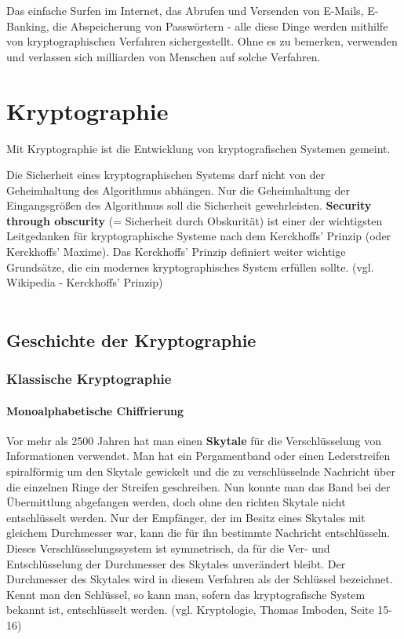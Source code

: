 \documentclass[11pt,a4paper]{report}
\begin{document}
Das einfache Surfen im Internet, das Abrufen und Versenden von E-Mails, E-Banking, die Abspeicherung von Passwörtern - alle diese Dinge werden mithilfe von kryptographischen Verfahren sichergestellt. Ohne es zu bemerken, verwenden und verlassen sich milliarden von Menschen auf solche Verfahren.

\section{Kryptographie}

Mit Kryptographie ist die Entwicklung von kryptografischen Systemen gemeint.

Die Sicherheit eines kryptographischen Systems darf nicht von der Geheimhaltung des Algorithmus abhängen. Nur die Geheimhaltung der Eingangsgrößen des Algorithmus soll die Sicherheit gewehrleisten. \textbf{Security through obscurity} (= Sicherheit durch Obskurität) ist einer der wichtigsten Leitgedanken für kryptographische Systeme nach dem Kerckhoffs' Prinzip (oder Kerckhoffs' Maxime). Das Kerckhoffs' Prinzip definiert weiter wichtige Grundsätze, die ein modernes kryptographisches System erfüllen sollte. (vgl. Wikipedia - Kerckhoffs' Prinzip)\\\\

\subsection{Geschichte der Kryptographie}

\subsubsection{Klassische Kryptographie}

\paragraph{Monoalphabetische Chiffrierung}

Vor mehr als 2500 Jahren hat man einen \textbf{Skytale} für die Verschlüsselung von Informationen verwendet. Man hat ein Pergamentband oder einen Lederstreifen spiralförmig um den Skytale gewickelt und die zu verschlüsselnde Nachricht über die einzelnen Ringe der Streifen geschreiben. Nun konnte man das Band bei der Übermittlung abgefangen werden, doch ohne den richten Skytale nicht entschlüsselt werden. Nur der Empfänger, der im Besitz eines Skytales mit gleichem Durchmesser war, kann die für ihn bestimmte Nachricht entschlüsseln. Dieses Verschlüsselungssystem ist symmetrisch, da für die Ver- und Entschlüsselung der Durchmesser des Skytales unverändert bleibt. Der Durchmesser des Skytales wird in diesem Verfahren als der Schlüssel bezeichnet. Kennt man den Schlüssel, so kann man, sofern das kryptografische System bekannt ist, entschlüsselt werden. (vgl. Kryptologie, Thomas Imboden, Seite 15-16)\\\\
\end{document}
